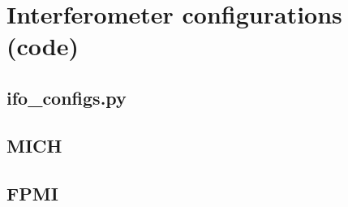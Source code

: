 














\section{Interferometer configurations (code)}
\subsection{ifo\_configs.py}


\subsection{MICH}


\subsection{FPMI}


